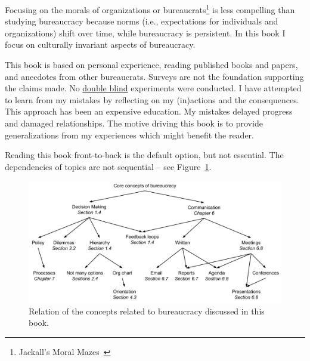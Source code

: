 

Focusing on the morals of organizations or bureaucrats\footnote{Jackall's Moral Mazes~\cite{2009_Jackall}} is less compelling than studying bureaucracy because norms (i.e., expectations for individuals and organizations) shift over time, while bureaucracy is persistent. 
In this book I focus on culturally invariant aspects of bureaucracy. 

This book is based on personal experience, reading published books and papers, and anecdotes from other bureaucrats. Surveys are not the foundation supporting the claims made. No \href{https://en.wikipedia.org/wiki/Blinded_experiment}{double blind} experiments were conducted. 
I have attempted to learn from my mistakes by reflecting on my (in)actions and the consequences. This approach has been an expensive education. My mistakes delayed progress and damaged relationships. The motive driving this book is to provide generalizations from my experiences which might benefit the reader.


Reading this book front-to-back is the default option, but not essential. The dependencies of topics are not sequential -- see Figure~\ref{fig:core-concepts}.

\begin{figure}[ht]
    \centering
    \includegraphics[width=1\textwidth]{images/core_concepts_map.pdf}
    \caption{Relation of the concepts related to bureaucracy discussed in this book. }
    \label{fig:core-concepts}
\end{figure}

